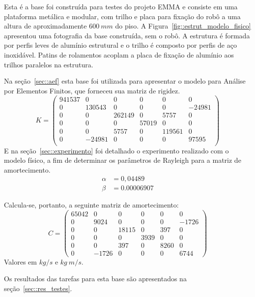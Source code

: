 Esta é a base foi construída para testes do projeto EMMA e consiste em uma
plataforma metálica e modular, com trilho e placa para fixação do robô a uma
altura de aproximadamente $600~mm$ do piso. A
Figura~\ref{fig::estrut_modelo_fisico} apresentou uma fotografia da base
construída, sem o robô.
A estrutura é formada por perfis leves de alumínio estrutural e o trilho é
composto por perfis de aço inoxidável. Patins de rolamentos
acoplam a placa de fixação de alumínio aos trilhos paralelos na estrutura.

Na seção~\ref{sec::aef} esta base foi utilizada para apresentar o modelo para
Análise por Elementos Finitos, que forneceu sua matriz de rigidez.
%
\begin{equation*}
	K =
\begin{pmatrix}
941537	&	0	&	0	&	0	&	0	&	0 \\
0	&	130543	&	0	&	0	&	0	&	-24981 \\
0	&	0	&	262149	&	0	&	5757	&	0 \\
0	&	0	&	0	&	57019	&	0	&	0 \\
0	&	0	&	5757	&	0	&	119561	&	0 \\
0	&	-24981	&	0	&	0	&	0	&	97595 \\
\end{pmatrix}
\end{equation*}
%
E na seção~\ref{sec::experimento} foi detalhado o experimento realizado com o
modelo físico, a fim de determinar os parâmetros de Rayleigh para a matriz de
amortecimento. 
%
\begin{align*}
	\alpha &= 0,04489 \\
	\beta &= 0.00006907
\end{align*}
%

Calcula-se, portanto, a seguinte matriz de amortecimento:
%
\begin{equation}
	C =
\begin{pmatrix}
65042	&	0		&	0		&	0		&	0		&	0		\\
0		&	9024	&	0		&	0		&	0		&	-1726	\\
0		&	0		&	18115	&	0		&	397	 	&	0		\\
0		&	0		&	0		&	3939 	&	0		&	0		\\
0		&	0		&	397		&	0		&	8260 	& 	0		\\
0		&	-1726	&	0		&	0		&	0		&	6744
\end{pmatrix}
\end{equation}
%
Valores em $kg/s$ e $kg~m/s$. 

Os resultados das tarefas para esta base são apresentados na
seção~\ref{sec::res_testes}.


